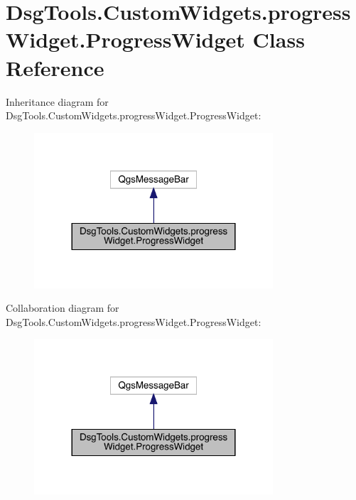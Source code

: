\hypertarget{class_dsg_tools_1_1_custom_widgets_1_1progress_widget_1_1_progress_widget}{}\section{Dsg\+Tools.\+Custom\+Widgets.\+progress\+Widget.\+Progress\+Widget Class Reference}
\label{class_dsg_tools_1_1_custom_widgets_1_1progress_widget_1_1_progress_widget}


Inheritance diagram for Dsg\+Tools.\+Custom\+Widgets.\+progress\+Widget.\+Progress\+Widget\+:
\nopagebreak
\begin{figure}[H]
\begin{center}
\leavevmode
\includegraphics[width=252pt]{class_dsg_tools_1_1_custom_widgets_1_1progress_widget_1_1_progress_widget__inherit__graph}
\end{center}
\end{figure}


Collaboration diagram for Dsg\+Tools.\+Custom\+Widgets.\+progress\+Widget.\+Progress\+Widget\+:
\nopagebreak
\begin{figure}[H]
\begin{center}
\leavevmode
\includegraphics[width=252pt]{class_dsg_tools_1_1_custom_widgets_1_1progress_widget_1_1_progress_widget__coll__graph}
\end{center}
\end{figure}
